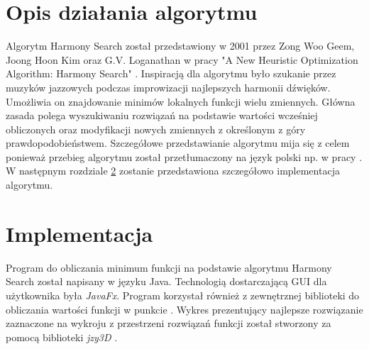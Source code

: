 \documentclass[10pt, a4paper]{article}
\begin{document}
\section{Opis działania algorytmu}
\label{sec:opis}
Algorytm Harmony Search został przedstawiony w 2001 przez Zong Woo Geem, Joong Hoon Kim oraz G.V. Loganathan w pracy "A New Heuristic Optimization Algorithm: Harmony Search" \cite{bib:orginal}. Inspiracją dla algorytmu było szukanie przez muzyków jazzowych podczas improwizacji najlepszych harmonii dźwięków. Umożliwia on znajdowanie minimów lokalnych funkcji wielu zmiennych. Główna zasada polega wyszukiwaniu rozwiązań na podstawie wartości wcześniej obliczonych oraz modyfikacji nowych zmiennych z określonym z góry prawdopodobieństwem. Szczegółowe przedstawianie algorytmu mija się z celem ponieważ przebieg algorytmu został przetłumaczony na język polski np. w pracy \cite{bib:tlumaczenie}. W następnym rozdziale \ref{sec:implementacja} zostanie przedstawiona szczegółowo implementacja algorytmu. 

\section{Implementacja}
\label{sec:implementacja}
Program do obliczania minimum funkcji na podstawie algorytmu Harmony Search został napisany w języku Java. Technologią dostarczającą GUI dla użytkownika była {\em JavaFx}. Program korzystał również z zewnętrznej biblioteki do obliczania wartości funkcji w punkcie \cite{bib:mathparser}. Wykres prezentujący najlepsze rozwiązanie zaznaczone na wykroju z przestrzeni rozwiązań funkcji został stworzony za pomocą biblioteki {\em jzy3D} \cite{bib:jzy3d}.
\end{document}
